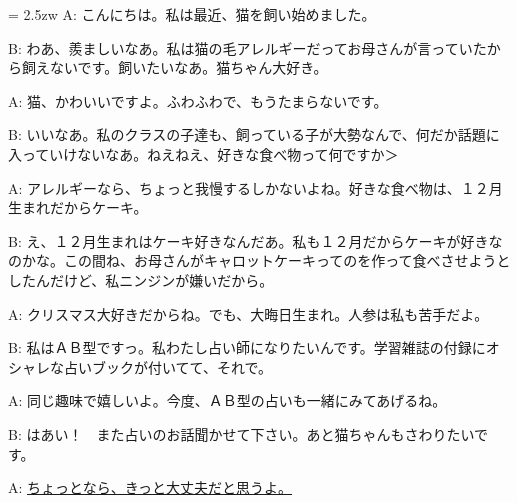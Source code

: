 \documentclass[11pt]{amsart}
\title{}
\author{}
\newenvironment{hangall}[1]{\hangindent = 2.5zw\everypar{\hangindent = 2.5zw}}{}
\begin{document}
\maketitle
\begin{hangall}{}%
A: こんにちは。私は最近、猫を飼い始めました。

B: わあ、羨ましいなあ。私は猫の毛アレルギーだってお母さんが言っていたから飼えないです。飼いたいなあ。猫ちゃん大好き。

A: 猫、かわいいですよ。ふわふわで、もうたまらないです。

B: いいなあ。私のクラスの子達も、飼っている子が大勢なんで、何だか話題に入っていけないなあ。ねえねえ、好きな食べ物って何ですか＞

A: アレルギーなら、ちょっと我慢するしかないよね。好きな食べ物は、１２月生まれだからケーキ。

B: え、１２月生まれはケーキ好きなんだあ。私も１２月だからケーキが好きなのかな。この間ね、お母さんがキャロットケーキってのを作って食べさせようとしたんだけど、私ニンジンが嫌いだから。

A: クリスマス大好きだからね。でも、大晦日生まれ。人参は私も苦手だよ。

B: 私はＡＢ型ですっ。私わたし占い師になりたいんです。学習雑誌の付録にオシャレな占いブックが付いてて、それで。

A: 同じ趣味で嬉しいよ。今度、ＡＢ型の占いも一緒にみてあげるね。

B: はあい！　また占いのお話聞かせて下さい。あと猫ちゃんもさわりたいです。

A: \ul{ちょっとなら、きっと大丈夫だと思うよ。}\end{hangall}
\end{document}
